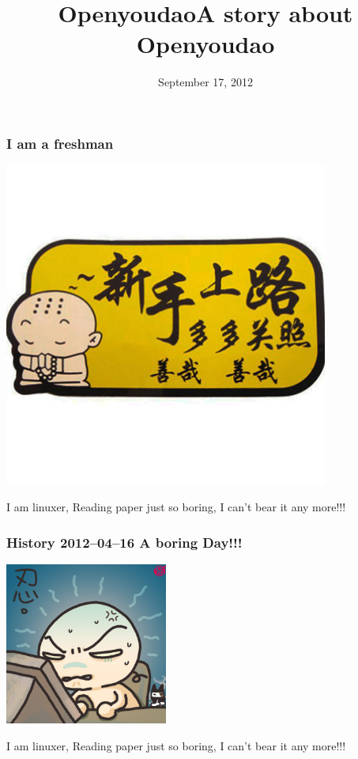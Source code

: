 \documentclass[10pt]{beamer}
\title{Openyoudao}
\title{A story about Openyoudao}
\date{September 17, 2012}
\begin{document}
\begin{frame}[plain]
  \titlepage
\end{frame}

\begin{frame}
  \frametitle{I am a freshman}

\begin{center} 
  \includegraphics[width=0.8\textwidth]{newer.jpg}
\end{center}
\medskip
\quad
\qquad

I am linuxer, Reading paper just so boring, I can't bear it any more!!!
\end{frame}

\begin{frame}
  \frametitle{History 2012--04--16 A boring Day!!!}

\begin{center} 
  \includegraphics[width=0.4\textwidth]{pic1.jpg}
\end{center}
\medskip
\quad
\qquad

I am linuxer, Reading paper just so boring, I can't bear it any more!!!
\end{frame}
\end{document}
